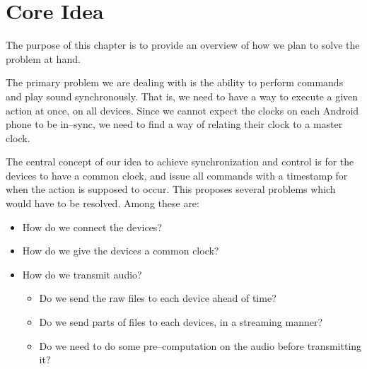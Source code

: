 \chapter{Core Idea} %

The purpose of this chapter is to provide an overview of how we plan to solve the problem at hand.



The primary problem we are dealing with is the ability to perform commands and play sound synchronously.
That is, we need to have a way to execute a given action at once, on all devices.
Since we cannot expect the clocks on each Android phone to be in--sync, we need to find a way of relating their clock to a master clock. 


The central concept of our idea to achieve synchronization and control is for the devices to have a common clock, and issue all commands with a timestamp for when the action is supposed to occur. 
This proposes several problems which would have to be resolved. 
Among these are: 

\begin{itemize}
	\item How do we connect the devices?
	\item How do we give the devices a common clock?
	\item How do we transmit audio?
	\begin{itemize}
		\item Do we send the raw files to each device ahead of time?
		\item Do we send parts of files to each devices, in a streaming manner?
		\item Do we need to do some pre--computation on the audio before transmitting it?
	\end{itemize}
\end{itemize}